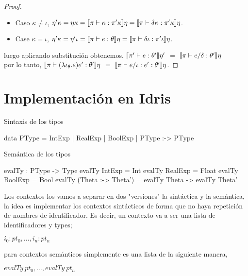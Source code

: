 \begin{proof}
\begin{itemize}
\item Caso $\kappa \neq \iota$, $\eta' \kappa = \eta \kappa = 
									\llbracket \pi \vdash \kappa : \pi'\kappa \rrbracket\eta = 
									\llbracket \pi \vdash \delta \kappa : \pi'\kappa \rrbracket\eta$.

\item Case $\kappa = \iota$, $\eta' \kappa = \eta' \iota = 
									 \llbracket \pi \vdash e : \theta \rrbracket\eta = 
									 \llbracket \pi \vdash \delta \iota : \pi'\iota \rrbracket\eta$.
\end{itemize}

luego aplicando substituci\'on obtenemos,
$\llbracket \pi' \vdash e : \theta' \rrbracket\eta'$ $=$ $\llbracket \pi \vdash e / \delta : \theta' \rrbracket\eta$\\

por lo tanto, $\llbracket \pi \vdash (\lambda \iota_{\theta} . e)e' : \theta' \rrbracket\eta$ $=$
 			  $\llbracket \pi \vdash e / \iota:e' : \theta' \rrbracket\eta$.

\end{proof}

\section{Implementaci\'on en Idris}

Sintaxis de los tipos
\begin{code}
data PType = IntExp | RealExp | BoolExp 
          | PType :-> PType
\end{code}

\noindent
Sem\'antica de los tipos
\begin{code}
evalTy : PType -> Type
evalTy IntExp    = Int
evalTy RealExp   = Float
evalTy BoolExp   = Bool
evalTy (Theta :-> Theta') = evalTy Theta -> evalTy Theta'
\end{code}

\noindent

Los contextos los vamos a separar en dos "versiones" la sint\'actica
y la semántica, la idea es implementar los contextos sint\'acticos de
forma que no haya repetición de nombres de identificador. Es decir,
un contexto va a ser una lista de identificadores y types;

\begin{center}
$i_0 : pt_0, \ldots , i_n:pt_n$
\end{center}

para contextos semánticos simplemente es una lista de la siguiente manera,

\begin{center}
$evalTy \ pt_0, \ldots , evalTy \ pt_n$
\end{center}


